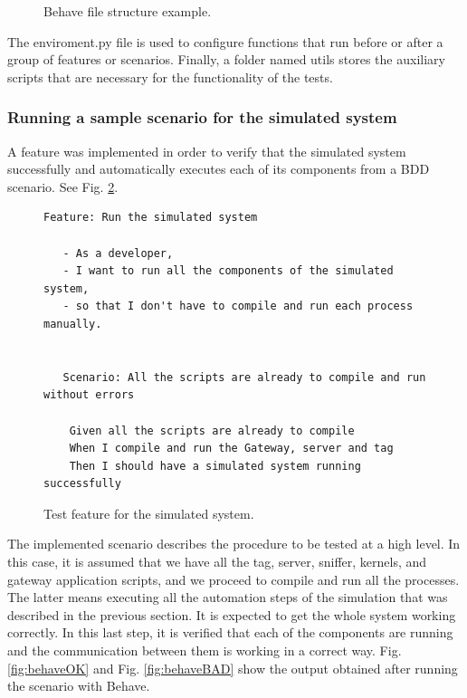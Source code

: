 \documentclass[journal]{IEEEtran}	%
\begin{document}
\begin{figure}[t!]
    \caption{Behave file structure example.}
    \label{fig:dirtree1}
\end{figure}

The enviroment.py file is used to configure functions that run before or after a group of features or scenarios. Finally, a folder named utils stores the auxiliary scripts that are necessary for the functionality of the tests.


\subsubsection{Running a sample scenario for the simulated system}


A feature was implemented in order to verify that the simulated system successfully and automatically executes each of its components from a BDD scenario. See Fig. \ref{fig:simsys}.

\begin{figure}[t!]
\centering
\begin{lstlisting}[]
 Feature: Run the simulated system

   - As a developer,
   - I want to run all the components of the simulated system,
   - so that I don't have to compile and run each process manually.


   Scenario: All the scripts are already to compile and run without errors

    Given all the scripts are already to compile 
    When I compile and run the Gateway, server and tag
    Then I should have a simulated system running successfully
\end{lstlisting}
\caption{Test feature for the simulated system.}
\label{fig:simsys}
\end{figure}

The implemented scenario describes the procedure to be tested at a high level. In this case, it is assumed that we have all the tag, server, sniffer, kernels, and gateway application scripts, and we proceed to compile and run all the processes. The latter means executing all the automation steps of the simulation that was described in the previous section. It is expected to get the whole system working correctly. In this last step, it is verified that each of the components are running and the communication between them is working in a correct way. Fig. \ref{fig:behaveOK} and Fig. \ref{fig:behaveBAD} show the output obtained after running the scenario with Behave.
\end{document}
